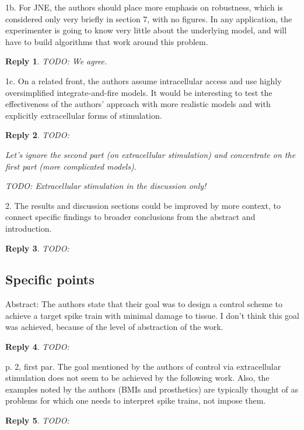 \documentclass{article}
\newtheorem*{rep}{Reply}
\begin{document}
1b. For JNE, the authors should place more emphasis on robustness, which is
considered only very briefly in section 7, with no figures. In any application,
the experimenter is going to know very little about the underlying model, and
will have to build algorithms that work around this problem.

\begin{rep} TODO: 
We agree.
\end{rep}

1c. On a related front, the authors assume intracellular access  and
use highly oversimplified integrate-and-fire models.  It would be interesting to
test the effectiveness of the authors’ approach with more realistic models and
with explicitly extracellular forms of stimulation. 

\begin{rep} TODO:

Let's ignore the second part (on extracellular stimulation) and concentrate on
the first part (more complicated models).

TODO: Extracellular stimulation in the discussion only!
\end{rep}

2. The results and discussion sections could be improved by more context, to
connect specific findings to broader conclusions from the abstract and
introduction. 
\begin{rep} 
TODO: 
\end{rep}


\subsection{Specific points}
Abstract: The authors state that their goal was to design a control scheme to
achieve a target spike train with minimal damage to tissue.  I don’t think this
goal was achieved, because of the level of abstraction of the work.

\begin{rep} 
TODO:
 \end{rep}

p. 2, first par.  The goal mentioned by the authors of control via extracellular
stimulation does not seem to be achieved by the following work.  Also, the
examples noted by the authors (BMIs and prosthetics) are typically thought of as
problems for which one needs to interpret spike trains, not impose them.


\begin{rep} TODO: \end{rep} 
\end{document}
